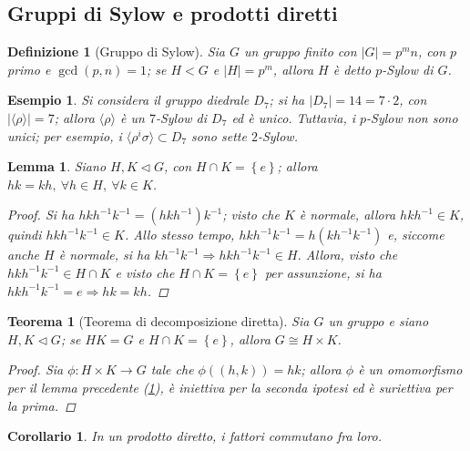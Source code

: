 \documentclass[12pt]{scrartcl}
\theoremstyle{style}
\newtheorem{esempio}{Esempio}[section]
\newtheorem{definizione}{Definizione}[section]
\newtheorem{teorema}{Teorema}[section]
\newtheorem{lemma}{Lemma}[teorema]
\newtheorem{corollario}{Corollario}[teorema]
\numberwithin{equation}{subsection}
\begin{document}
\subsection{Gruppi di Sylow e prodotti diretti}
\begin{definizione}
	[Gruppo di Sylow]
	Sia $G$ un gruppo finito con $\lvert G \rvert = p^m n$, con $p$ primo e $\operatorname{gcd}(p,n) =1$; se $H < G$ e $\lvert H \rvert = p^m$, allora $H$ \`e detto $p$-Sylow di $G$.
\end{definizione}
\begin{esempio}
Si considera il gruppo diedrale $D_7$; si ha $\lvert D_7 \rvert = 14 = 7 \cdot 2$, con $\lvert \langle \rho  \rangle \rvert = 7$; allora $\langle \rho  \rangle$ \`e un $7$-Sylow di $D_7$ ed \`e unico.
Tuttavia, i $p$-Sylow non sono unici; per esempio, i $\langle \rho ^i \sigma \rangle\subset D_7$ sono sette $2$-Sylow.
\end{esempio}
\begin{lemma}\label{lemprec161}
	Siano $H,K\lhd G$, con $H \cap K = \left\{ e \right\} $; allora $hk = kh, \ \forall h\in H, \ \forall k \in K$.
	\begin{proof}
		Si ha $hkh^{-1}k^{-1}= (hkh^{-1})k^{-1}$; visto che $K$ \`e normale, allora $hkh^{-1}\in K$, quindi $hkh^{-1}k^{-1}\in K$.
		Allo stesso tempo, $hkh^{-1}k^{-1}= h(kh^{-1}k^{-1})$ e, siccome anche $H$ \`e normale, si ha $kh^{-1}k^{-1}\Rightarrow hkh^{-1}k^{-1}\in H$.
		Allora, visto che $hkh^{-1}k^{-1}\in H\cap K$ e visto che $H\cap K = \left\{ e \right\} $ per assunzione, si ha $hkh^{-1}k^{-1}=e \Rightarrow hk=kh$.
	\end{proof}
\end{lemma}
\begin{teorema}[Teorema di decomposizione diretta]\label{t171}
	Sia $G$ un gruppo e siano $H,K \lhd G$; se $HK = G$ e $H\cap K = \left\{ e \right\} $, allora $G \cong H \times  K$.
	\begin{proof}
		Sia $\phi :H \times  K \to G$ tale che $\phi ((h,k))=hk$; allora $\phi $ \`e un omomorfismo per il lemma precedente (\ref{lemprec161}), \`e iniettiva per la seconda ipotesi ed \`e suriettiva per la prima.
	\end{proof}
\end{teorema}
\begin{corollario}
	In un prodotto diretto, i fattori commutano fra loro.
\end{corollario}	
\end{document}
